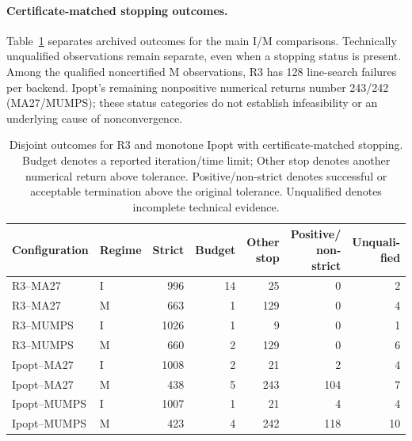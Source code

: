 \documentclass[pdflatex,sn-mathphys-num]{sn-jnl}
\theoremstyle{thmstyleone}
\theoremstyle{thmstylethree}
\begin{document}
\paragraph{Certificate-matched stopping outcomes.}
Table~\ref{tab:failure-breakdown} separates archived outcomes for the main
I/M comparisons. Technically unqualified observations remain separate,
even when a stopping status is present. Among the qualified noncertified
M observations, R3 has 128 line-search failures per backend. Ipopt's
remaining nonpositive numerical returns number 243/242 (MA27/MUMPS);
these status categories do not establish infeasibility or an underlying
cause of nonconvergence.

\begin{table}[!htbp]
\centering\footnotesize\setlength{\tabcolsep}{3pt}
\caption{Disjoint outcomes for R3 and monotone Ipopt with certificate-matched
stopping. Budget denotes a reported iteration/time limit; Other stop denotes
another numerical return above tolerance. Positive/non-strict denotes
successful or acceptable termination above the original tolerance.
Unqualified denotes incomplete technical evidence.}
\label{tab:failure-breakdown}
\begin{tabular}{@{}llrrrrr@{}}
\toprule
Configuration & Regime & Strict & Budget & \shortstack{Other\\stop} & \shortstack{Positive/\\non-strict} & \shortstack{Unquali-\\fied} \\
\midrule
R3--MA27 & I & 996 & 14 & 25 & 0 & 2\\
R3--MA27 & M & 663 & 1 & 129 & 0 & 4\\
R3--MUMPS & I & 1026 & 1 & 9 & 0 & 1\\
R3--MUMPS & M & 660 & 2 & 129 & 0 & 6\\
Ipopt--MA27 & I & 1008 & 2 & 21 & 2 & 4\\
Ipopt--MA27 & M & 438 & 5 & 243 & 104 & 7\\
Ipopt--MUMPS & I & 1007 & 1 & 21 & 4 & 4\\
Ipopt--MUMPS & M & 423 & 4 & 242 & 118 & 10\\
\bottomrule
\end{tabular}

\end{table}
\end{document}
